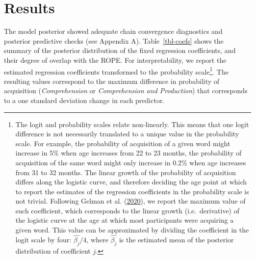 \documentclass[
]{article}
\begin{document}
\hypertarget{sec-results}{%
\section{Results}\label{sec-results}}

The model posterior showed adequate chain convergence diagnostics and
posterior predictive checks (see Appendix A). Table~\ref{tbl-coefs}
shows the summary of the posterior distribution of the fixed regression
coefficients, and their degree of overlap with the ROPE. For
interpretability, we report the estimated regression coefficients
transformed to the probability scale\footnote{The logit and probability
  scales relate non-linearly. This means that one logit difference is
  not necessarily translated to a unique value in the probability scale.
  For example, the probability of acquisition of a given word might
  increase in 5\% when age increases from 22 to 23 months, the
  probability of acquisition of the same word might only increase in
  0.2\% when age increases from 31 to 32 months. The linear growth of
  the probability of acquisition differs along the logistic curve, and
  therefore deciding the age point at which to report the estimates of
  the regression coefficients in the probability scale is not trivial.
  Following Gelman et al.
  (\protect\hyperlink{ref-gelman2020regression}{2020}), we report the
  maximum value of such coefficient, which corresponds to the linear
  growth (i.e.~derivative) of the logistic curve at the age at which
  most participants were acquiring a given word. This value can be
  approximated by dividing the coefficient in the logit scale by four:
  \(\hat{\beta_j}/4\), where \(\hat{\beta_j}\) is the estimated mean of
  the posterior distribution of coefficient \(j\).}. The resulting
values correspond to the maximum difference in probability of
acquisition (\emph{Comprehension} or \emph{Comprehension and
Production}) that corresponds to a one standard deviation change in each
predictor.
\end{document}
